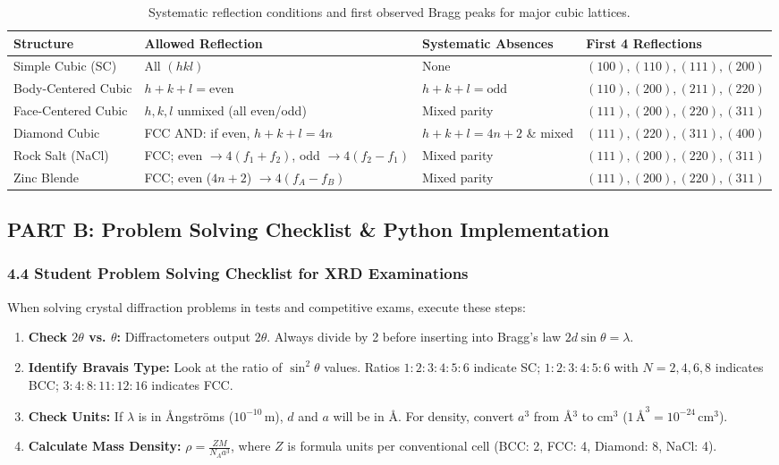 \documentclass[11pt,a4paper]{article}
\begin{document}
\begin{table}[htbp]
\centering
\small
\begin{tabular}{p{2.6cm}p{4.2cm}p{4.2cm}p{3.8cm}}
\toprule
\textbf{Structure} & \textbf{Allowed Reflection} & \textbf{Systematic Absences} & \textbf{First 4 Reflections} \\
\midrule
Simple Cubic (SC) & All $(hkl)$ & None & $(100), (110), (111), (200)$ \\
Body-Centered Cubic & $h+k+l = \text{even}$ & $h+k+l = \text{odd}$ & $(110), (200), (211), (220)$ \\
Face-Centered Cubic & $h, k, l$ unmixed (all even/odd) & Mixed parity & $(111), (200), (220), (311)$ \\
Diamond Cubic & FCC AND: if even, $h+k+l=4n$ & $h+k+l = 4n+2$ \& mixed & $(111), (220), (311), (400)$ \\
Rock Salt (NaCl) & FCC; even $\to 4(f_1+f_2)$, odd $\to 4(f_2-f_1)$ & Mixed parity & $(111), (200), (220), (311)$ \\
Zinc Blende & FCC; even ($4n+2$) $\to 4(f_A - f_B)$ & Mixed parity & $(111), (200), (220), (311)$ \\
\bottomrule
\end{tabular}
\caption{Systematic reflection conditions and first observed Bragg peaks for major cubic lattices.}
\label{tab:extinctions}
\end{table}

\subsection{PART B: Problem Solving Checklist \& Python Implementation}

\subsubsection{4.4 Student Problem Solving Checklist for XRD Examinations}
When solving crystal diffraction problems in tests and competitive exams, execute these steps:
\begin{enumerate}[leftmargin=1.8em]
    \item \textbf{Check $2\theta$ vs. $\theta$:} Diffractometers output $2\theta$. Always divide by 2 before inserting into Bragg's law $2d\sin\theta = \lambda$.
    \item \textbf{Identify Bravais Type:} Look at the ratio of $\sin^2\theta$ values. Ratios $1:2:3:4:5:6$ indicate SC; $1:2:3:4:5:6$ with $N=2,4,6,8$ indicates BCC; $3:4:8:11:12:16$ indicates FCC.
    \item \textbf{Check Units:} If $\lambda$ is in \AA ngströms ($10^{-10}$\,m), $d$ and $a$ will be in \AA. For density, convert $a^3$ from \AA$^3$ to $\text{cm}^3$ ($1\,\text{\AA}^3 = 10^{-24}\,\text{cm}^3$).
    \item \textbf{Calculate Mass Density:} $\rho = \frac{Z M}{N_A a^3}$, where $Z$ is formula units per conventional cell (BCC: 2, FCC: 4, Diamond: 8, NaCl: 4).
\end{enumerate}
\end{document}
